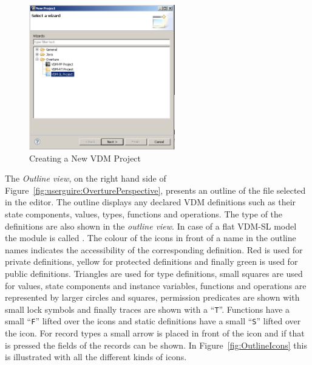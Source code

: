 \documentclass{overturerepchap}
\begin{document}
\begin{figure}[!h]
\begin{center}
  \caption[labelInTOC]{Creating a New VDM Project}
  \label{fig:userguide:newOvertureProjectSL}
  \includegraphics[width=2.5in]{figures/newovertureSLproject}
\end{center}
\end{figure}


The \emph{Outline view}, on the right hand side of 
Figure~\ref{fig:userguire:OverturePerspective}, presents an outline of the file selected
in the editor. The outline displays any declared VDM definitions such as
their state components, values, types, functions and operations. The
type of the definitions are also shown in the \emph{outline view}. In
case of a flat VDM-SL model the module is called {}.
The colour of the icons in front of a name in the outline names
indicates the accessibility of the corresponding definition. Red is
used for private definitions, yellow for protected definitions and
finally green is used for public definitions. Triangles are used for
type definitions, small squares are used for values, state components
and instance variables, functions and operations are represented by
larger circles and squares, permission predicates are shown with small
lock symbols and finally traces are shown with a
``\texttt{T}''. Functions have a small ``\texttt{F}'' lifted over the
icons and static definitions have a small ``\texttt{S}'' lifted over
the icon. For record types a small arrow is placed in front of the
icon and if that is pressed the fields of the records can be shown. In
Figure~\ref{fig:OutlineIcons} this is illustrated with all the
different kinds of icons.
\end{document}
